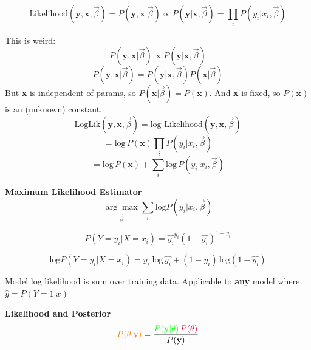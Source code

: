 \documentclass[letterpaper, 10.5pt,landscape]{article}
\makeatletter
\def\mathcolor#1#{\@mathcolor{#1}}
\def\@mathcolor#1#2#3{%
  \protect\leavevmode
  \begingroup
    \color#1{#2}#3%
  \endgroup
}
\makeatother
\begin{document}
\begin{multicols*}{3}
\[\text{Likelihood} (\textbf{y}, \textbf{x}, \vec{\beta}) = P(\textbf{y},\textbf{x}|\vec{\beta}) \propto P(\textbf{y}|\textbf{x}, \vec{\beta}) = \prod_{i} P(y_{i}|x_{i}, \vec{\beta}) \]

This is weird: \[ P(\textbf{y},\textbf{x} | \vec{\beta}) \propto P(\textbf{y} | \textbf{x}, \vec{\beta}) \]
\[ P(\textbf{y},\textbf{x} | \vec{\beta}) = P(\textbf{y} | \textbf{x}, \vec{\beta}) P(\textbf{x}|\vec{\beta}) \]
But \textbf{x} is independent of params, so \(P(\textbf{x}|\vec{\beta}) = P(\textbf{x}) \). And \textbf{x} is fixed, so \(P(\textbf{x}) \) is an (unknown) constant.
\[\text{LogLik}(\textbf{y}, \textbf{x}, \vec{\beta}) = \text{log Likelihood}(\textbf{y},\textbf{x}, \vec{\beta}) \]
\vspace{-5pt}
\[= \text{log} \, P(\textbf{x}) \prod_{i} P\left( y_{i}|x_{i}, \vec{\beta} \right) \] \vspace{-3pt}
\[= \text{log} \, P(\textbf{x})  + \sum_{i} \text{log} \, P \left( y_{i}|x_{i}, \vec{\beta} \right) \] 

\vspace{3pt}
\textbf{Maximum Likelihood Estimator}
\[ \underset{\vec{\beta}} {\arg\max} \sum_{i} \text{log} P\left(y_{i} | x_{i}, \vec{\beta} \right) \]

\vspace{-5pt}

\[P \left(Y=y_{i} | X=x_{i} \right) = \hat{y_{i}}^{y_{i}} \left(1- \hat{y_{i}}\right)^{1-y_{i}}  \]

\vspace{-10pt}

\[\text{log} P \left(Y=y_{i} | X=x_{i} \right) = y_{i} \; \text{log}\,  \hat{y_{i}} +  (1-y_{i}) \, \text{log}\left(1- \hat{y_{i}}\right)  \]

Model log likelihood is sum over training data. Applicable to \textbf{any} model where \(\hat{y} = P(Y=1 |x) \) 


\vspace{3pt}
\textbf{Likelihood and Posterior} 
\[\mathcolor{orange}{P(\theta |\textbf{y})} = \frac{\mathcolor{green}{P(\textbf{y}|\theta)} \, \mathcolor{purple}{P(\theta)} }{P(\textbf{y})} \]
\vspace{-5pt}





\end{multicols*}
\end{document}
